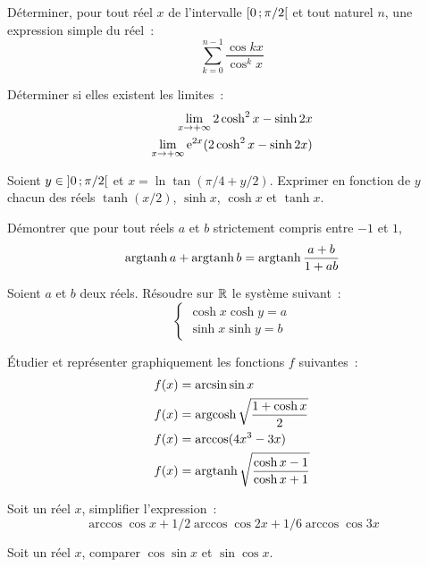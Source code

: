 \begin{exercice}
    Déterminer, pour tout réel \(x\) de l'intervalle \(\left[ 0 \, ;  \pi/2 \right[\) et tout naturel \(n\), une expression simple du réel~:
    \begin{equation}
        \sum_{k=0}^{n-1} \frac{\cos kx}{\cos^k x}
    \end{equation}
\end{exercice}
\begin{exercice}
    Déterminer si elles existent les limites~:
    \begin{align}
        \lim\limits_{x \to +\infty} 2\cosh^2x-\sinh 2x \\
        \lim\limits_{x \to +\infty} \operatorname{e}^{2x}(2\cosh^2x-\sinh 2x)
    \end{align}
\end{exercice}
\begin{exercice}
    Soient \(y \in \left] 0 \, ;  \pi/2 \right[\) et \(x = \ln\tan(\pi/4+y/2)\). Exprimer en fonction de \(y\) chacun des réels \(\tanh(x/2)\), \(\sinh x\), \(\cosh x\) et \(\tanh x\).
\end{exercice}
\begin{exercice}
    Démontrer que pour tout réels \(a\) et \(b\) strictement compris entre \(-1\) et \(1\),
    \begin{equation}
        \operatorname{argtanh} a + \operatorname{argtanh} b = \operatorname{argtanh} \frac{a+b}{1+ab}
    \end{equation}
\end{exercice}
\begin{exercice}
    Soient \(a\) et \(b\) deux réels. Résoudre sur \(\mathbb{R}\) le système suivant~:
    \begin{equation}
        \begin{cases} \cosh x \cosh y = a \\ \sinh x \sinh y = b \end{cases}
    \end{equation}
\end{exercice}
\begin{exercice}
    Étudier et représenter graphiquement les fonctions \(f\) suivantes~:
    \begin{align}
        f(x) &= \arcsin \sin x \\
        f(x) &= \operatorname{argcosh} \sqrt{\frac{1+\cosh x}{2}} \\
        f(x) &= \arccos(4x^3-3x) \\
        f(x) &= \operatorname{argtanh}\sqrt{\frac{\cosh x - 1}{\cosh x + 1}}
    \end{align}
\end{exercice}
\begin{exercice}
    Soit un réel \(x\), simplifier l'expression~:
    \begin{equation}
        \arccos \cos x + 1/2 \arccos\cos 2x + 1/6\arccos\cos 3x
    \end{equation}
\end{exercice}
\begin{exercice}
    Soit un réel \(x\), comparer \(\cos\sin x\) et \(\sin\cos x\).
\end{exercice}
